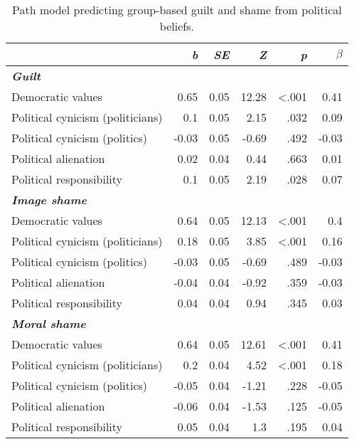 \documentclass[
]{article}
\begin{document}
\begin{table}[H]

\caption{\label{tab:TableS1}Path model predicting group-based guilt and shame from political beliefs.}
\centering
\fontsize{8}{10}\selectfont
\begin{tabular}[t]{lrrrrr}
\toprule
\em{ } & \em{b} & \em{SE} & \em{Z} & \em{p} & \em{$\beta$}\\
\midrule
\em{\textbf{Guilt}} & \em{\textbf{}} & \em{\textbf{}} & \em{\textbf{}} & \em{\textbf{}} & \em{\textbf{}}\\
Democratic values & 0.65 & 0.05 & 12.28 & <.001 & 0.41\\
Political cynicism (politicians) & 0.1 & 0.05 & 2.15 & .032 & 0.09\\
Political cynicism (politics) & -0.03 & 0.05 & -0.69 & .492 & -0.03\\
Political alienation & 0.02 & 0.04 & 0.44 & .663 & 0.01\\
\addlinespace
Political responsibility & 0.1 & 0.05 & 2.19 & .028 & 0.07\\
\em{\textbf{Image shame}} & \em{\textbf{}} & \em{\textbf{}} & \em{\textbf{}} & \em{\textbf{}} & \em{\textbf{}}\\
Democratic values & 0.64 & 0.05 & 12.13 & <.001 & 0.4\\
Political cynicism (politicians) & 0.18 & 0.05 & 3.85 & <.001 & 0.16\\
Political cynicism (politics) & -0.03 & 0.05 & -0.69 & .489 & -0.03\\
\addlinespace
Political alienation & -0.04 & 0.04 & -0.92 & .359 & -0.03\\
Political responsibility & 0.04 & 0.04 & 0.94 & .345 & 0.03\\
\em{\textbf{Moral shame}} & \em{\textbf{}} & \em{\textbf{}} & \em{\textbf{}} & \em{\textbf{}} & \em{\textbf{}}\\
Democratic values & 0.64 & 0.05 & 12.61 & <.001 & 0.41\\
Political cynicism (politicians) & 0.2 & 0.04 & 4.52 & <.001 & 0.18\\
\addlinespace
Political cynicism (politics) & -0.05 & 0.04 & -1.21 & .228 & -0.05\\
Political alienation & -0.06 & 0.04 & -1.53 & .125 & -0.05\\
Political responsibility & 0.05 & 0.04 & 1.3 & .195 & 0.04\\
\bottomrule
\end{tabular}
\end{table}
\end{document}
